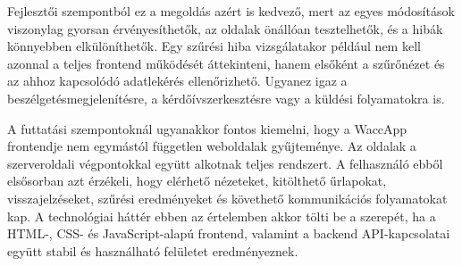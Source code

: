 Fejlesztői szempontból ez a megoldás azért is kedvező, mert az egyes módosítások viszonylag gyorsan érvényesíthetők, az oldalak önállóan tesztelhetők, és a hibák könnyebben elkülöníthetők. Egy szűrési hiba vizsgálatakor például nem kell azonnal a teljes frontend működését áttekinteni, hanem elsőként a szűrőnézet és az ahhoz kapcsolódó adatlekérés ellenőrizhető. Ugyanez igaz a beszélgetésmegjelenítésre, a kérdőívszerkesztésre vagy a küldési folyamatokra is.

A futtatási szempontoknál ugyanakkor fontos kiemelni, hogy a WaccApp frontendje nem egymástól független weboldalak gyűjteménye. Az oldalak a szerveroldali végpontokkal együtt alkotnak teljes rendszert. A felhasználó ebből elsősorban azt érzékeli, hogy elérhető nézeteket, kitölthető űrlapokat, visszajelzéseket, szűrési eredményeket és követhető kommunikációs folyamatokat kap. A technológiai háttér ebben az értelemben akkor tölti be a szerepét, ha a HTML-, CSS- és JavaScript-alapú frontend, valamint a backend API-kapcsolatai együtt stabil és használható felületet eredményeznek.
